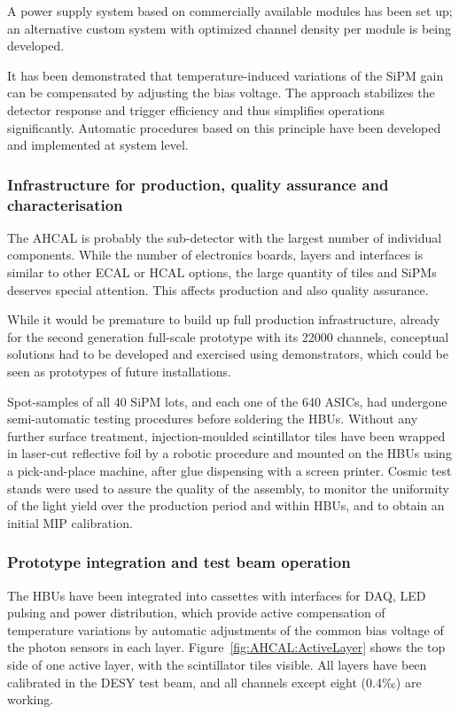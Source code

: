 A power supply system based on commercially available modules has been set up; an alternative custom system with optimized channel density per module is being developed.

It has been demonstrated that temperature-induced variations of the SiPM gain can be compensated by adjusting the bias voltage. The approach stabilizes the detector response and trigger efficiency and thus simplifies operations significantly. Automatic procedures based on this principle have been developed and implemented at system level.

\subsubsection{Infrastructure for production, quality assurance and characterisation}

The AHCAL is probably the sub-detector with the largest number of individual components. While the number of electronics boards, layers and interfaces is similar to other ECAL or HCAL options, the large quantity of tiles and SiPMs deserves special attention. This affects production and also quality assurance.

While it would be premature to build up full production infrastructure, already for the second generation full-scale prototype with its 22000 channels, conceptual solutions had to be developed and exercised using demonstrators, which could be seen as prototypes of future installations.

Spot-samples of all 40 SiPM lots, and each one of the 640 ASICs, had undergone semi-automatic testing procedures before soldering the HBUs. Without any further surface treatment, injection-moulded scintillator tiles have been wrapped in laser-cut reflective foil by a robotic procedure and mounted on the HBUs using a pick-and-place machine, after glue dispensing with a screen printer. Cosmic test stands were used to assure the quality of the assembly, to monitor the uniformity of the light yield over the production period and within HBUs, and to obtain an initial MIP calibration.

\subsubsection{Prototype integration and test beam operation}
 The HBUs have been integrated into cassettes with interfaces for DAQ, LED pulsing and power distribution, which provide active compensation of temperature variations by automatic adjustments of the common bias voltage of the photon sensors in each layer. Figure~\ref{fig:AHCAL:ActiveLayer} shows the top side of one active layer, with the scintillator tiles visible. All layers have been calibrated in the DESY test beam, and all channels except eight (0.4‰) are working.

